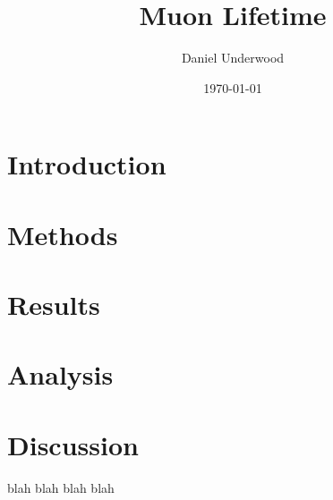 \documentclass[10pt,a4paper]{article}
\begin{document}
\title{Muon Lifetime}
\author{Daniel Underwood}
\date{\today}


\begin{abstract}
\end{abstract}

\maketitle

\section{Introduction}

\section{Methods}

\section{Results}

\section{Analysis}

\section{Discussion}

blah blah \cite{Chitwood2007} blah blah \cite{Longland}

\printbibliography
\end{document}
